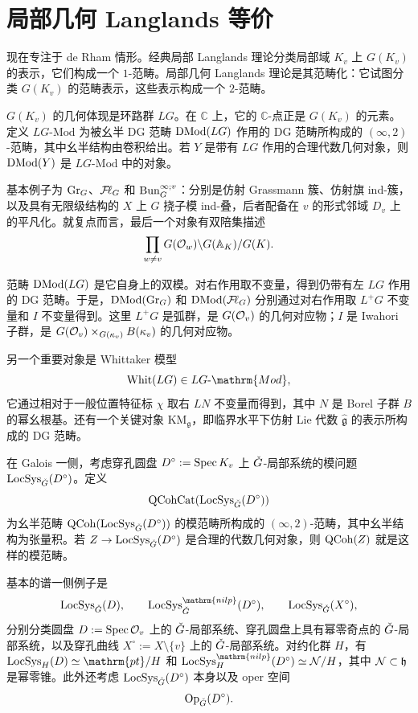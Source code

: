 \section{局部几何 Langlands 等价}\label{sec:1.4}
现在专注于 de Rham 情形。经典局部 Langlands 理论分类局部域 $K_v$ 上 $G(K_v)$ 的表示，它们构成一个 $1$-范畴。局部几何 Langlands 理论是其范畴化：它试图分类 $G(K_v)$ 的范畴表示，这些表示构成一个 $2$-范畴。

$G(K_v)$ 的几何体现是环路群 $LG$。在 $\mathbb C$ 上，它的 $\mathbb C$-点正是 $G(K_v)$ 的元素。定义 $LG\text{-}\mathrm{Mod}$ 为被幺半 DG 范畴 $\operatorname{DMod}(LG)$ 作用的 DG 范畴所构成的 $(\infty,2)$-范畴，其中幺半结构由卷积给出。若 $Y$ 是带有 $LG$ 作用的合理代数几何对象，则 $\operatorname{DMod}(Y)$ 是 $LG\text{-}\mathrm{Mod}$ 中的对象。

基本例子为 $\operatorname{Gr}_G$、$\mathcal{F}\!\ell_G$ 和 $\operatorname{Bun}_G^{\infty;v}$：分别是仿射 Grassmann 簇、仿射旗 ind-簇，以及具有无限级结构的 $X$ 上 $G$ 挠子模 ind-叠，后者配备在 $v$ 的形式邻域 $D_v$ 上的平凡化。就复点而言，最后一个对象有双陪集描述
\[\prod_{w\ne v}G(\mathcal{O}_w)\backslash G(\mathbb{A}_K)/G(K).\]

范畴 $\operatorname{DMod}(LG)$ 是它自身上的双模。对右作用取不变量，得到仍带有左 $LG$ 作用的 DG 范畴。于是，$\operatorname{DMod}(\operatorname{Gr}_G)$ 和 $\operatorname{DMod}(\mathcal{F}\!\ell_G)$ 分别通过对右作用取 $L^+G$ 不变量和 $I$ 不变量得到。这里 $L^+G$ 是弧群，是 $G(\mathcal{O}_v)$ 的几何对应物；$I$ 是 Iwahori 子群，是 $G(\mathcal{O}_v)\times_{G(\kappa_v)}B(\kappa_v)$ 的几何对应物。

另一个重要对象是 Whittaker 模型
\[\Whit(LG)\in LG\text{-}\mathrm{Mod},\]
它通过相对于一般位置特征标 $\chi$ 取右 $LN$ 不变量而得到，其中 $N$ 是 Borel 子群 $B$ 的幂幺根基。还有一个关键对象 $\mathrm{KM}_{\mathfrak g}$，即临界水平下仿射 Lie 代数 $\widehat{\mathfrak g}$ 的表示所构成的 DG 范畴。

在 Galois 一侧，考虑穿孔圆盘 $D^\circ:=\operatorname{Spec} K_v$ 上 $\check{G}$-局部系统的模问题 $\operatorname{LocSys}_{\check{G}}(D^\circ)$。定义
\[\operatorname{QCohCat}(\operatorname{LocSys}_{\check{G}}(D^\circ))\]
为幺半范畴 $\operatorname{QCoh}(\operatorname{LocSys}_{\check{G}}(D^\circ))$ 的模范畴所构成的 $(\infty,2)$-范畴，其中幺半结构为张量积。若 $Z\to\operatorname{LocSys}_{\check{G}}(D^\circ)$ 是合理的代数几何对象，则 $\operatorname{QCoh}(Z)$ 就是这样的模范畴。

基本的谱一侧例子是
\[\LocSys_{\checkG}(D),\qquad\LocSys_{\checkG}^{\mathrm{nilp}}(D^\circ),\qquad\LocSys_{\checkG}(X^\circ),\]
分别分类圆盘 $D:=\operatorname{Spec}\mathcal{O}_v$ 上的 $\check{G}$-局部系统、穿孔圆盘上具有幂零奇点的 $\check{G}$-局部系统，以及穿孔曲线 $X^\circ:=X\setminus\{v\}$ 上的 $\check{G}$-局部系统。对约化群 $H$，有 $\LocSys_H(D)\simeq\mathrm{pt}/H$ 和 $\LocSys_H^{\mathrm{nilp}}(D^\circ)\simeq\cN/H$，其中 $\mathcal{N}\subset\mathfrak h$ 是幂零锥。此外还考虑 $\operatorname{LocSys}_{\check{G}}(D^\circ)$ 本身以及 oper 空间
\[\operatorname{Op}_{\check{G}}(D^\circ).\]

